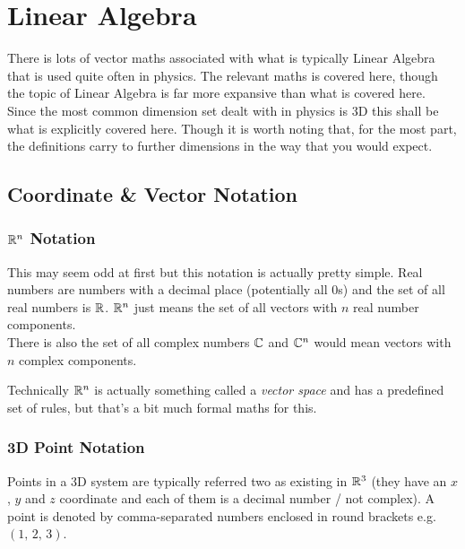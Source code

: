 \documentclass[main.tex]{subfiles}
\begin{document}
    \chapter{Linear Algebra}
        \label{ch: Linear Algebra}
        \thispagestyle{noheader}

        There is lots of vector maths associated with what is typically Linear Algebra that is used quite often in physics. The relevant maths is covered here, though the topic of Linear Algebra is far more expansive than what is covered here.\\
        Since the most common dimension set dealt with in physics is 3D this shall be what is explicitly covered here. Though it is worth noting that, for the most part, the definitions carry to further dimensions in the way that you would expect.

        \section{Coordinate \& Vector Notation}
            \label{sec: Coordinate and Vector Notation}
            
            \subsection{$\mathbb{R}^n$ Notation}
                \label{subsec: Rn Notation}

                This may seem odd at first but this notation is actually pretty simple. Real numbers are numbers with a decimal place (potentially all 0s) and the set of all real numbers is $\mathbb{R}$. $\mathbb{R}^n$ just means the set of all vectors with $n$ real number components.\\
                There is also the set of all complex numbers $\mathbb{C}$ and $\mathbb{C}^n$ would mean vectors with $n$ complex components.

                Technically $\mathbb{R}^n$ is actually something called a \textit{vector space} and has a predefined set of rules, but that's a bit much formal maths for this.

            \subsection{3D Point Notation}
                \label{subsec: 3D Point Notation}

                Points in a 3D system are typically referred two as existing in $\mathbb{R}^3$ (they have an $x$, $y$ and $z$ coordinate and each of them is a decimal number / not complex).
                A point is denoted by comma-separated numbers enclosed in round brackets e.g. $(1,\, 2,\, 3)$.
\end{document}
